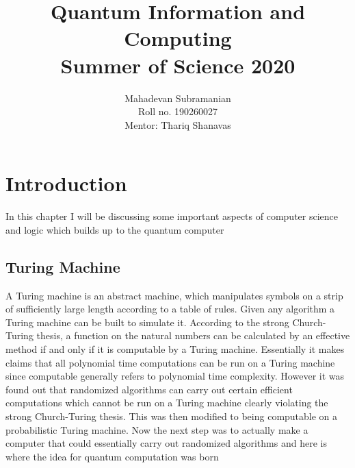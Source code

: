 \documentclass{report}
\title{%
  \huge Quantum Information and Computing\\
  \Large Summer of Science 2020\\}
\author{Mahadevan Subramanian\\
        Roll no. 190260027\\
        Mentor: Thariq Shanavas}
\date{ }
\begin{document}
\maketitle

\tableofcontents

\chapter{Introduction}

In this chapter I will be discussing some important aspects of computer science and logic which builds up to the quantum computer

\section{Turing Machine}
A Turing machine is an abstract machine, which manipulates symbols on a strip of sufficiently large length according to a table of rules. Given any algorithm a Turing machine can be built to simulate it. According to the strong Church-Turing thesis, a function on the natural numbers can be calculated by an effective method if and only if it is computable by a Turing machine. Essentially it makes claims that all polynomial time computations can be run on a Turing machine since computable generally refers to polynomial time complexity. However it was found out that randomized algorithms can carry out certain efficient computations which cannot be run on a Turing machine clearly violating the strong Church-Turing thesis. This was then modified to being computable on a probabilistic Turing machine.
Now the next step was to actually make a computer that could essentially carry out randomized algorithms and here is where the idea for quantum computation was born
\end{document}
